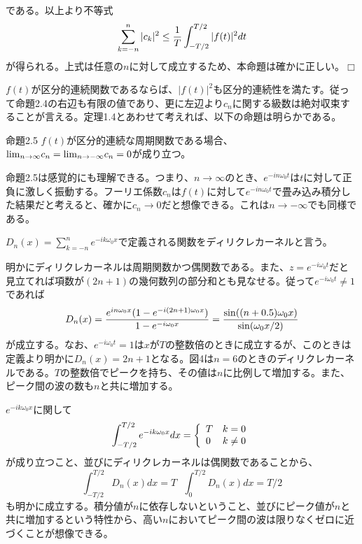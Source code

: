 \documentclass[dvipdfmx, 9pt, a4paper]{jsarticle}
\def\qed{\hfill $\Box$}
\begin{document}
である。以上より不等式
\begin{equation}
\sum_{k=-n}^n|c_k|^2 \leq \frac{1}{T}\int_{-T/2}^{T/2}|f(t)|^2dt \notag
\end{equation}
が得られる。上式は任意の$n$に対して成立するため、本命題は確かに正しい。\qed \par
$f(t)$が区分的連続関数であるならば、$|f(t)|^2$も区分的連続性を満たす。従って命題2.4の右辺も有限の値であり、更に左辺より$c_n$に関する級数は絶対収束することが言える。定理1.4とあわせて考えれば、以下の命題は明らかである。
\begin{itembox}[l]{命題2.5}
$f(t)$が区分的連続な周期関数である場合、${\rm lim}_{n \to \infty}c_n={\rm lim}_{n \to -\infty}c_n=0$が成り立つ。
\end{itembox}\par
命題2.5は感覚的にも理解できる。つまり、$n \to \infty$のとき、$e^{-in\omega_0t}$は$t$に対して正負に激しく振動する。フーリエ係数$c_n$は$f(t)$に対して$e^{-in\omega_0t}$で畳み込み積分した結果だと考えると、確かに$c_n \to 0$だと想像できる。これは$n \to -\infty$でも同様である。
\begin{tcolorbox}[title=ディリクレカーネル]
$D_n(x)=\sum_{k=-n}^ne^{-ik\omega_0x}$で定義される関数をディリクレカーネルと言う。
\end{tcolorbox}
明かにディリクレカーネルは周期関数かつ偶関数である。また、$z=e^{-i\omega_0t}$だと見立てれば項数が$(2n+1)$の幾何数列の部分和とも見なせる。従って$e^{-i\omega_0t} \neq 1$であれば
\begin{equation}
D_n(x)=\frac{e^{in\omega_0x}(1-e^{-i(2n+1)\omega_0x})}{1-e^{-i\omega_0x}}=\frac{{\rm sin}((n+0.5)\omega_0x)}{{\rm sin}(\omega_0x/2)} \notag
\end{equation}
が成立する。なお、$e^{-i\omega_0t}=1$は$x$が$T$の整数倍のときに成立するが、このときは定義より明かに$D_n(x)=2n+1$となる。図4は$n=6$のときのディリクレカーネルである。$T$の整数倍でピークを持ち、その値は$n$に比例して増加する。また、ピーク間の波の数も$n$と共に増加する。\par
$e^{-ik\omega_0x}$に関して
\begin{equation}
\int_{-T/2}^{T/2}e^{-ik\omega_0x}dx=
\left\{
\begin{array}{ll}
T & k=0 \\
0 & k \neq 0
\end{array}
\right. \notag
\end{equation}
が成り立つこと、並びにディリクレカーネルは偶関数であることから、
\begin{equation}
\int_{-T/2}^{T/2}D_n(x)dx=T~~~\int_{0}^{T/2}D_n(x)dx=T/2
\end{equation}
も明かに成立する。積分値が$n$に依存しないということ、並びにピーク値が$n$と共に増加するという特性から、高い$n$においてピーク間の波は限りなくゼロに近づくことが想像できる。
\end{document}
